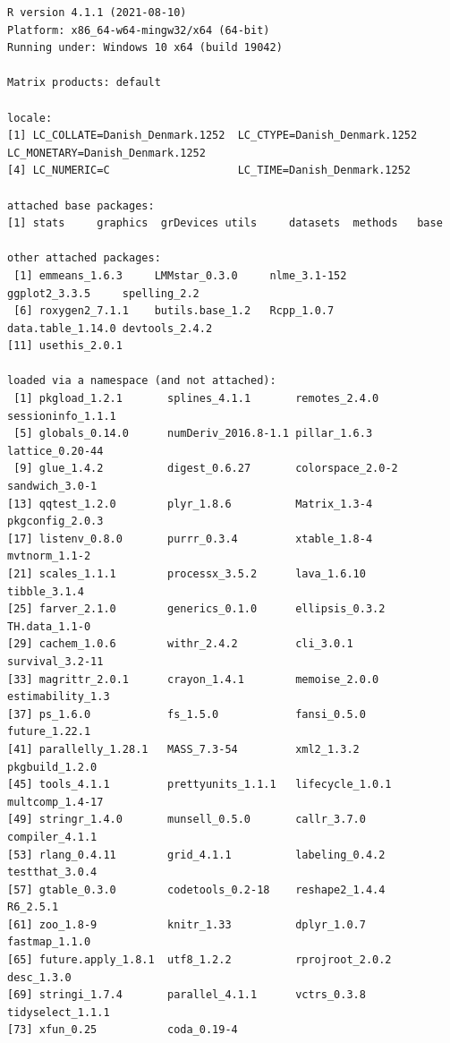 \documentclass[12pt]{article}
\begin{document}
\begin{verbatim}
R version 4.1.1 (2021-08-10)
Platform: x86_64-w64-mingw32/x64 (64-bit)
Running under: Windows 10 x64 (build 19042)

Matrix products: default

locale:
[1] LC_COLLATE=Danish_Denmark.1252  LC_CTYPE=Danish_Denmark.1252    LC_MONETARY=Danish_Denmark.1252
[4] LC_NUMERIC=C                    LC_TIME=Danish_Denmark.1252    

attached base packages:
[1] stats     graphics  grDevices utils     datasets  methods   base     

other attached packages:
 [1] emmeans_1.6.3     LMMstar_0.3.0     nlme_3.1-152      ggplot2_3.3.5     spelling_2.2     
 [6] roxygen2_7.1.1    butils.base_1.2   Rcpp_1.0.7        data.table_1.14.0 devtools_2.4.2   
[11] usethis_2.0.1    

loaded via a namespace (and not attached):
 [1] pkgload_1.2.1       splines_4.1.1       remotes_2.4.0       sessioninfo_1.1.1  
 [5] globals_0.14.0      numDeriv_2016.8-1.1 pillar_1.6.3        lattice_0.20-44    
 [9] glue_1.4.2          digest_0.6.27       colorspace_2.0-2    sandwich_3.0-1     
[13] qqtest_1.2.0        plyr_1.8.6          Matrix_1.3-4        pkgconfig_2.0.3    
[17] listenv_0.8.0       purrr_0.3.4         xtable_1.8-4        mvtnorm_1.1-2      
[21] scales_1.1.1        processx_3.5.2      lava_1.6.10         tibble_3.1.4       
[25] farver_2.1.0        generics_0.1.0      ellipsis_0.3.2      TH.data_1.1-0      
[29] cachem_1.0.6        withr_2.4.2         cli_3.0.1           survival_3.2-11    
[33] magrittr_2.0.1      crayon_1.4.1        memoise_2.0.0       estimability_1.3   
[37] ps_1.6.0            fs_1.5.0            fansi_0.5.0         future_1.22.1      
[41] parallelly_1.28.1   MASS_7.3-54         xml2_1.3.2          pkgbuild_1.2.0     
[45] tools_4.1.1         prettyunits_1.1.1   lifecycle_1.0.1     multcomp_1.4-17    
[49] stringr_1.4.0       munsell_0.5.0       callr_3.7.0         compiler_4.1.1     
[53] rlang_0.4.11        grid_4.1.1          labeling_0.4.2      testthat_3.0.4     
[57] gtable_0.3.0        codetools_0.2-18    reshape2_1.4.4      R6_2.5.1           
[61] zoo_1.8-9           knitr_1.33          dplyr_1.0.7         fastmap_1.1.0      
[65] future.apply_1.8.1  utf8_1.2.2          rprojroot_2.0.2     desc_1.3.0         
[69] stringi_1.7.4       parallel_4.1.1      vctrs_0.3.8         tidyselect_1.1.1   
[73] xfun_0.25           coda_0.19-4
\end{verbatim}
\end{document}
